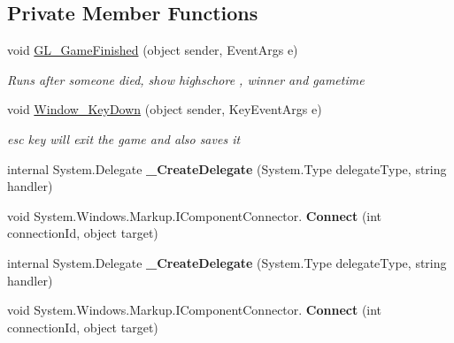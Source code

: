 \subsection*{Private Member Functions}
\begin{DoxyCompactItemize}
\item 
void \mbox{\hyperlink{class_bomberman_1_1_u_i_1_1_game_window_a994982fe05408e41b09d728c7d104f1e}{G\+L\+\_\+\+Game\+Finished}} (object sender, Event\+Args e)
\begin{DoxyCompactList}\small\item\em Runs after someone died, show highschore , winner and gametime \end{DoxyCompactList}\item 
void \mbox{\hyperlink{class_bomberman_1_1_u_i_1_1_game_window_adf71feba9c454450bc901263aa93e442}{Window\+\_\+\+Key\+Down}} (object sender, Key\+Event\+Args e)
\begin{DoxyCompactList}\small\item\em esc key will exit the game and also saves it \end{DoxyCompactList}\item 
\mbox{\label{class_bomberman_1_1_u_i_1_1_game_window_a5a339c727e7b39379beec051edbb3713}} 
internal System.\+Delegate {\bfseries \+\_\+\+Create\+Delegate} (System.\+Type delegate\+Type, string handler)
\item 
\mbox{\label{class_bomberman_1_1_u_i_1_1_game_window_ae0df75995920e5f781019d3ca515fcf0}} 
void System.\+Windows.\+Markup.\+I\+Component\+Connector. {\bfseries Connect} (int connection\+Id, object target)
\item 
\mbox{\label{class_bomberman_1_1_u_i_1_1_game_window_a5a339c727e7b39379beec051edbb3713}} 
internal System.\+Delegate {\bfseries \+\_\+\+Create\+Delegate} (System.\+Type delegate\+Type, string handler)
\item 
\mbox{\label{class_bomberman_1_1_u_i_1_1_game_window_ae0df75995920e5f781019d3ca515fcf0}} 
void System.\+Windows.\+Markup.\+I\+Component\+Connector. {\bfseries Connect} (int connection\+Id, object target)
\end{DoxyCompactItemize}

